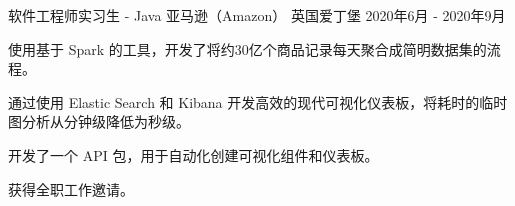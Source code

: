 \begin{cventries}
\cventry
{软件工程师实习生 - Java} %
{亚马逊（Amazon）} %
{英国爱丁堡} %
{2020年6月 - 2020年9月} %
{
\begin{cvitems} %
\item {使用基于 Spark 的工具，开发了将约30亿个商品记录每天聚合成简明数据集的流程。}
\item {通过使用 Elastic Search 和 Kibana 开发高效的现代可视化仪表板，将耗时的临时图分析从分钟级降低为秒级。}
\item {开发了一个 API 包，用于自动化创建可视化组件和仪表板。}
\item {获得全职工作邀请。}
\end{cvitems}
}


\end{cventries}